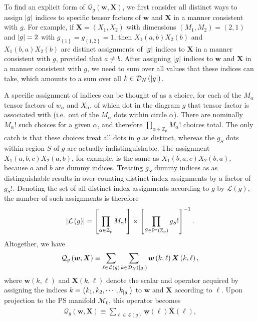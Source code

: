 \documentclass[nofootinbib,notitlepage,11pt]{revtex4-2}
\newcommand{\p}[1]{\left(#1\right)} %
\renewcommand{\sp}[1]{\left[#1\right]} %
\renewcommand{\set}[1]{\left\{#1\right\}} %
\newcommand{\m}{\bm} %
\newcommand{\1}{\mathds{1}}
\newcommand{\D}{\mathcal{D}}
\renewcommand{\L}{\mathcal{L}}
\newcommand{\M}{\mathcal{M}}
\newcommand{\Q}{\mathcal{Q}}
\newcommand{\PP}{\mathbb{P}}
\newcommand{\ZZ}{\mathbb{Z}}
\newcommand{\col}{\underline}
\newcommand{\mean}{\overline}
\begin{document}
To find an explicit form of $\Q_g\p{\m w,\m X}$, we first consider all
distinct ways to assign $\abs{g}$ indices to specific tensor factors
of $\m w$ and $\m X$ in a manner consistent with $g$.  For example, if
$\m X=\p{X_1,X_2}$ with dimensions $\p{M_1,M_2}=\p{2,1}$ and
$\abs{g}=2$ with $g_{\set{1}}=g_{\set{1,2}}=1$, then
$X_1\p{a,b} X_2\p{b}$ and $X_1\p{b,a} X_2\p{b}$ are distinct
assignments of $\abs{g}$ indices to $\m X$ in a manner consistent with
$g$, provided that $a\ne b$.  After assigning $\abs{g}$ indices to
$\m w$ and $\m X$ in a manner consistent with $g$, we need to sum over
all values that these indices can take, which amounts to a sum over
all $k\in\D_N\p{\abs{g}}$.

A specific assignment of indices can be thought of as a choice, for
each of the $M_\alpha$ tensor factors of $w_\alpha$ and $X_\alpha$, of
which dot in the diagram $g$ that tensor factor is associated with
(i.e.~out of the $M_\alpha$ dots within circle $\alpha$).  There are
nominally $M_\alpha!$ such choices for a given $\alpha$, and therefore
$\prod_{\alpha\in\ZZ_p}M_\alpha!$ choices total.  The only catch is
that these choices treat all dots in $g$ as distinct, whereas the
$g_S$ dots within region $S$ of $g$ are actually indistinguishable.
The assignment $X_1\p{a,b,c} X_2\p{a,b}$, for example, is the same as
$X_1\p{b,a,c} X_2\p{b,a}$, because $a$ and $b$ are dummy indices.
Treating $g_S$ dummy indices as as distinguishable results in
over-counting distinct index assignments by a factor of $g_S!$.
Denoting the set of all distinct index assignments according to $g$ by
$\L\p{g}$, the number of such assignments is therefore
\begin{align}
  \abs{\L\p{g}} = \sp{\prod_{\alpha\in\ZZ_p}M_\alpha!}
  \times \sp{\prod_{S\in\PP^*\p{\ZZ_p}} g_S!}^{-1}.
  \label{eq:symmetry}
\end{align}
Altogether, we have
\begin{align}
  \Q_g\p{\m w,\m X} \equiv
  \sum_{\ell\in\L\p{g}} \sum_{k\in\D_N\p{\abs{g}}}
  \m w\p{k,\ell} \m X\p{k,\ell},
\end{align}
where $\m w\p{k,\ell}$ and $\m X\p{k,\ell}$ denote the scalar and
operator acquired by assigning the indices
$k=\p{k_1,k_2,\cdots,k_{\abs{g}}}$ to $\m w$ and $\m X$ according to
$\ell$.  Upon projection to the PS manifold $\M_0$, this operator
becomes
\begin{align}
  \Q_g\p{\m w,\m X} \equiv
  \sum_{\ell\in\L\p{g}} \col{\m w}\p{\ell} \mean{\m X}\p{\ell},
  \label{eq:sum_assignments}
\end{align}
\end{document}
